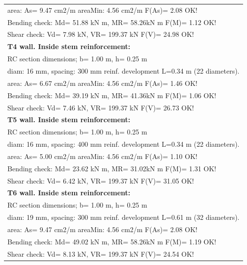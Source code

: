 \begin{center}
\begin{supertabular}{|l|}
  area: As=   9.47 cm2/m areaMin:   4.56 cm2/m  F(As)= 2.08 OK!\\
  Bending check: Md=  51.88 kN m, MR=  58.26kN m  F(M)= 1.12 OK!\\
  Shear check: Vd=   7.98 kN,  VR= 199.37 kN  F(V)= 24.98 OK!\\
\hline
\textbf{T4 wall. Inside stem reinforcement:}\\
  RC section dimensions; b= 1.00 m, h= 0.25 m\\
  diam: 16 mm, spacing: 300 mm  reinf. development L=0.34 m (22 diameters).\\
  area: As=   6.67 cm2/m areaMin:   4.56 cm2/m  F(As)= 1.46 OK!\\
  Bending check: Md=  39.19 kN m, MR=  41.36kN m  F(M)= 1.06 OK!\\
  Shear check: Vd=   7.46 kN,  VR= 199.37 kN  F(V)= 26.73 OK!\\
\hline
\textbf{T5 wall. Inside stem reinforcement:}\\
  RC section dimensions; b= 1.00 m, h= 0.25 m\\
  diam: 16 mm, spacing: 400 mm  reinf. development L=0.34 m (22 diameters).\\
  area: As=   5.00 cm2/m areaMin:   4.56 cm2/m  F(As)= 1.10 OK!\\
  Bending check: Md=  23.62 kN m, MR=  31.02kN m  F(M)= 1.31 OK!\\
  Shear check: Vd=   6.42 kN,  VR= 199.37 kN  F(V)= 31.05 OK!\\
\hline
\textbf{T6 wall. Inside stem reinforcement:}\\
  RC section dimensions; b= 1.00 m, h= 0.25 m\\
  diam: 19 mm, spacing: 300 mm  reinf. development L=0.61 m (32 diameters).\\
  area: As=   9.47 cm2/m areaMin:   4.56 cm2/m  F(As)= 2.08 OK!\\
  Bending check: Md=  49.02 kN m, MR=  58.26kN m  F(M)= 1.19 OK!\\
  Shear check: Vd=   8.13 kN,  VR= 199.37 kN  F(V)= 24.54 OK!\\
\end{supertabular}
\end{center}

